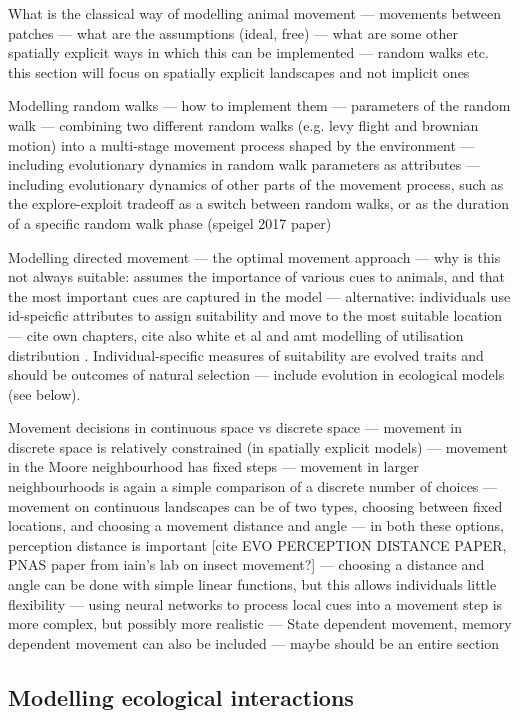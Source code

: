 What is the classical way of modelling animal movement --- movements between patches --- what are the assumptions (ideal, free) --- what are some other spatially explicit ways in which this can be implemented --- random walks etc. this section will focus on spatially explicit landscapes and not implicit ones

Modelling random walks --- how to implement them --- parameters of the random walk --- combining two different random walks (e.g. levy flight and brownian motion) into a multi-stage movement process shaped by the environment --- including evolutionary dynamics in random walk parameters as attributes --- including evolutionary dynamics of other parts of the movement process, such as the explore-exploit tradeoff as a switch between random walks, or as the duration of a specific random walk phase (speigel 2017 paper)

Modelling directed movement --- the optimal movement approach \citep{scherer2020} --- why is this not always suitable: assumes the importance of various cues to animals, and that the most important cues are captured in the model --- alternative: individuals use id-speicfic attributes to assign suitability and move to the most suitable location --- cite own chapters, cite also white et al and amt modelling of utilisation distribution \citep{signer2017,signer2019}. 
Individual-specific measures of suitability are evolved traits and should be outcomes of natural selection --- include evolution in ecological models (see below).

Movement decisions in continuous space vs discrete space --- movement in discrete space is relatively constrained (in spatially explicit models) --- movement in the Moore neighbourhood has fixed steps --- movement in larger neighbourhoods is again a simple comparison of a discrete number of choices --- movement on continuous landscapes can be of two types, choosing between fixed locations, and choosing a movement distance and angle --- in both these options, perception distance is important [cite EVO PERCEPTION DISTANCE PAPER, PNAS paper from iain's lab on insect movement?] --- choosing a distance and angle can be done with simple linear functions, but this allows individuals little flexibility --- using neural networks to process local cues into a movement step is more complex, but possibly more realistic \cite*{mueller2011} --- State dependent movement, memory dependent movement can also be included --- maybe should be an entire section

\subsection*{Modelling ecological interactions}

